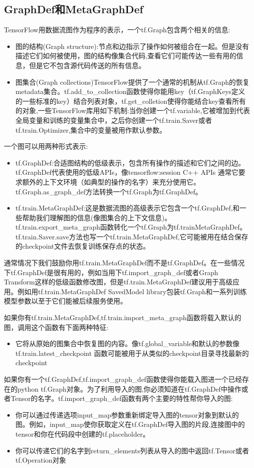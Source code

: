 \subsection{GraphDef和MetaGraphDef}
TensorFlow用数据流图作为程序的表示，一个tf.Graph包含两个相关的信息:
\begin{itemize}
\item 图的结构(Graph structure):节点和边指示了操作如何被组合在一起。但是没有描述它们如何被使用，图的结构像集合代码,查看它们可能传达一些有用的信息，但是它不包含源代码传送的所有信息。
\item 图集合(Graph collections)TensorFlow提供了一个通常的机制从tf.Graph的恢复metadata集合。tf.add\_to\_collection函数使得你能用key（tf.GraphKeys定义的一些标准的key）结合列表对象，tf.get\_colletion使得你能结合key查看所有的对象,一些TensorFlow库用如下机制:当你创建一个tf.variable,它被增加到代表全局变量和训练的变量集合中，之后你创建一个tf.train.Saver或者tf.train.Optimizer,集合中的变量被用作默认参数。
\end{itemize}
一个图可以用两种形式表示:
\begin{itemize}
	\item tf.GraphDef:合适图结构的低级表示，包含所有操作的描述和它们之间的边。tf.GraphDef代表使用的低级APIs，像tensorflow:session C++ APIs 通常它要求额外的上下文环境（如典型的操作的名字）来充分使用它。tf.Graph.as\_graph\_def方法转换一个tf.Graph为tf.GraphDef。
	\item tf.train.MetaGraphDef:这是数据流图的高级表示它包含一个tf.GraphDef,和一些帮助我们理解图的信息(像图集合的上下文信息)。tf.train.export\_meta\_graph函数转化一个tf.Graph为tf.trainMetaGraphDef。tf.train.Saver.save方法也写一个\newline tf.train.MetaGraphDef,它可能被用在结合保存的checkpoint文件去恢复训练保存点的状态。
\end{itemize}
通常情况下我们鼓励你用tf.train.MetaGraphDef而不是tf.GraphDef。在一些情况下tf.GraphDef是很有用的，例如当用下tf.import\_graph\_def或者Graph Transform这样的低级函数修改图，但是tf.train.MetaGraphDef建议用于高级应用。例如用tf.train.MetaGraphDef SavedModel library包装tf.Graph和一系列训练模型参数以至于它们能被后续服务使用。

如果你有tf.train.MetaGraphDef,tf.train.import\_meta\_graph函数将载入默认的图，调用这个函数有下面两种特征:
\begin{itemize}
	\item 它将从原始的图集合中恢复图的内容。像tf.global\_variable和默认的参数像 \newline tf.train.latest\_checkpoint 函数可能被用于从类似的checkpoint目录寻找最新的checkpoint
\end{itemize}
如果你有一个tf.GraphDef,tf.import\_graph\_def函数使得你能载入图进一个已经存在的python tf.Graph对象。为了利用导入的图,你必须知道在tf.GraphDef中操作或者Tensor的名字。tf.import\_graph\_def函数有两个主要的特性帮你导入的图:
\begin{itemize}
	\item 你可以通过传递选项input\_map参数重新绑定导入图的tensor对象到默认的图。例如，input\_map使你获取定义在tf.GraphDef导入图的片段,连接图中的tensor和你在代码段中创建的tf.placeholder。
	\item 你可以传递它们的名字到return\_elements列表从导入的图中返回tf.Tensor或者tf.Operation对象
\end{itemize}
